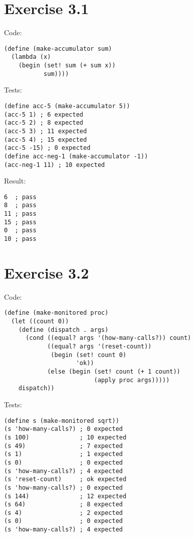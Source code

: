 \documentclass[../main.tex]{subfiles}
\begin{document}
\section{Exercise 3.1}

Code:

\begin{lstlisting}
(define (make-accumulator sum)
  (lambda (x)
    (begin (set! sum (+ sum x))
           sum))))
\end{lstlisting}

Tests:

\begin{lstlisting}
(define acc-5 (make-accumulator 5))
(acc-5 1) ; 6 expected
(acc-5 2) ; 8 expected
(acc-5 3) ; 11 expected
(acc-5 4) ; 15 expected
(acc-5 -15) ; 0 expected
(define acc-neg-1 (make-accumulator -1))
(acc-neg-1 11) ; 10 expected
\end{lstlisting}

Result:

\begin{lstlisting}
6  ; pass
8  ; pass
11 ; pass
15 ; pass
0  ; pass
10 ; pass
\end{lstlisting}

\section{Exercise 3.2}

Code:

\begin{lstlisting}
(define (make-monitored proc)
  (let ((count 0))
    (define (dispatch . args)
      (cond ((equal? args '(how-many-calls?)) count)
            ((equal? args '(reset-count))
             (begin (set! count 0)
                    'ok))
            (else (begin (set! count (+ 1 count))
                         (apply proc args)))))
    dispatch))
\end{lstlisting}

Tests:

\begin{lstlisting}
(define s (make-monitored sqrt))
(s 'how-many-calls?) ; 0 expected
(s 100)              ; 10 expected
(s 49)               ; 7 expected
(s 1)                ; 1 expected
(s 0)                ; 0 expected
(s 'how-many-calls?) ; 4 expected
(s 'reset-count)     ; ok expected
(s 'how-many-calls?) ; 0 expected
(s 144)              ; 12 expected
(s 64)               ; 8 expected
(s 4)                ; 2 expected
(s 0)                ; 0 expected
(s 'how-many-calls?) ; 4 expected
\end{lstlisting}
\end{document}
